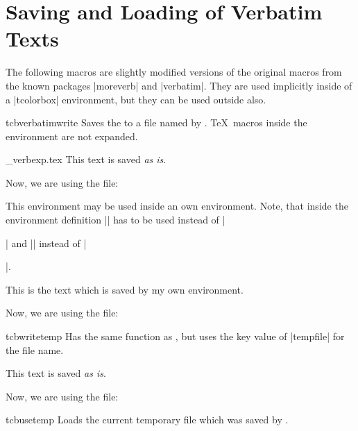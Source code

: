 \clearpage
\section{Saving and Loading of Verbatim Texts}
The following macros are slightly modified versions of the original macros
from the known packages |moreverb| and |verbatim|.
They are used implicitly inside of a |tcolorbox| environment,
but they can be used outside also.
\enlargethispage*{1.5cm}

\begin{docEnvironment}{tcbverbatimwrite}{}
  Saves the  to a file named by .
  \TeX\ macros inside the environment are not expanded.
\begin{dispExample}
\begin{tcbverbatimwrite}{\jobname_verbexp.tex}
  This text is saved \textit{as is}.
\end{tcbverbatimwrite}

Now, we are using the file:\par

\end{dispExample}

This environment may be used inside an own environment. Note, that inside
the environment definition |\tcbverbatimwrite| has to be used instead of
|\begin{tcbverbatimwrite}| and |\endtcbverbatimwrite| instead of |\end{tcbverbatimwrite}|.
\begin{dispExample}
\newenvironment{myverbatim}{%
  \begingroup{}}%
  {\endtcbverbatimwrite\endgroup}

\begin{myverbatim}
  This is the text which is saved by my own environment.
\end{myverbatim}

Now, we are using the file:\par

\end{dispExample}
\end{docEnvironment}

\begin{docEnvironment}{tcbwritetemp}{}
  Has the same function as , but uses the key value
  of |tempfile| for the file name.
\begin{dispExample}
\begin{tcbwritetemp}
  This text is saved \textit{as is}.
\end{tcbwritetemp}

Now, we are using the file:\par
\tcbusetemp
\end{dispExample}
\end{docEnvironment}


\begin{docCommand}{tcbusetemp}{}
  Loads the current temporary file which was saved by .
\end{docCommand}
